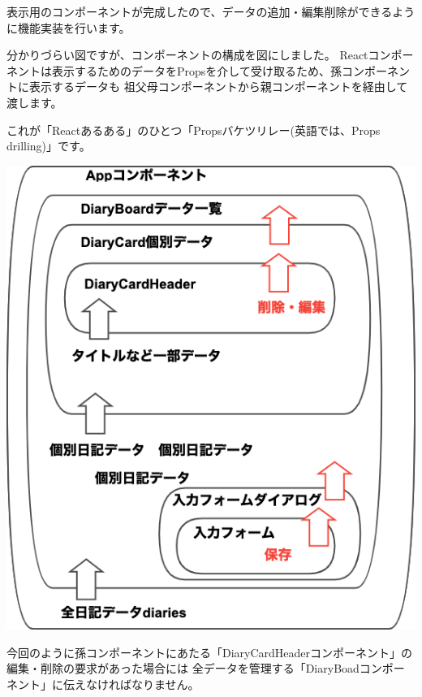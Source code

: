 表示用のコンポーネントが完成したので、データの追加・編集削除ができるように機能実装を行います。

\vspace*{\baselineskip}

分かりづらい図ですが、コンポーネントの構成を図にしました。
Reactコンポーネントは表示するためのデータをPropsを介して受け取るため、孫コンポーネントに表示するデータも
祖父母コンポーネントから親コンポーネントを経由して渡します。

\vspace*{\baselineskip}

これが「Reactあるある」のひとつ「Propsバケツリレー(英語では、Props drilling)」です。

\begin{reviewimage}[H]%
\includegraphics[width=0.7\maxwidth]{./images/03-todo-with-react/AppComponents.png}%
\label{image:03-todo-with-react:AppComponents}
\end{reviewimage}

\clearpage


今回のように孫コンポーネントにあたる「DiaryCardHeaderコンポーネント」の編集・削除の要求があった場合には
全データを管理する「DiaryBoadコンポーネント」に伝えなければなりません。

